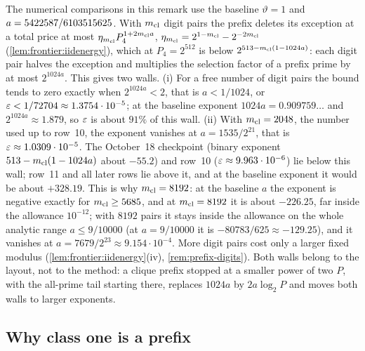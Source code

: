 \begin{remark}\label{rem:record:prefix-walls}
The numerical comparisons in this remark use the baseline $\vartheta=1$ and $a=5422587/6103515625$. With $m_{\mathrm{cl}}$ digit pairs the prefix deletes its exception at a total price at most
$\eta_{m_{\mathrm{cl}}}P_4^{1+2m_{\mathrm{cl}} a}$, $\eta_{m_{\mathrm{cl}}}=2^{1-m_{\mathrm{cl}}}-2^{-2m_{\mathrm{cl}}}$
(\cref{lem:frontier:iidenergy}),
which at $P_4=2^{512}$ is below $2^{513-m_{\mathrm{cl}}(1-1024a)}$: each digit pair halves the
exception and multiplies the selection factor of a prefix prime by at most
$2^{1024a}$. This gives two walls. (i) For a free number of digit pairs the
bound tends to zero exactly when $2^{1024a}<2$, that is $a<1/1024$, or
$\varepsilon<1/72704\approx1.3754\cdot10^{-5}$; at the baseline exponent
$1024a=0.909759\ldots$ and $2^{1024a}\approx1.879$, so $\varepsilon$ is about $91\%$ of
this wall. (ii) With $m_{\mathrm{cl}}=2048$, the number used up to row~10, the exponent
vanishes at $a=1535/2^{21}$, that is $\varepsilon\approx1.0309\cdot10^{-5}$. The October~18 checkpoint (binary exponent $513-m_{\mathrm{cl}}(1-1024a)$ about $-55.2$) and row~10
($\varepsilon\approx9.963\cdot10^{-6}$) lie below this wall; row~11 and all later rows
lie above it, and at the baseline exponent it would be about $+328.19$. This is why
$m_{\mathrm{cl}}=8192$: at the baseline $a$ the exponent is negative exactly for $m_{\mathrm{cl}}\ge5685$,
and at $m_{\mathrm{cl}}=8192$ it is about $-226.25$, far inside the allowance $10^{-12}$;
with $8192$ pairs it stays inside the allowance on the whole analytic range
$a\le9/10000$ (at $a=9/10000$ it is $-80783/625\approx-129.25$), and it vanishes
at $a=7679/2^{23}\approx9.154\cdot10^{-4}$. More digit pairs cost only a larger
fixed modulus (\cref{lem:frontier:iidenergy}(iv), \cref{rem:prefix-digits}).
Both walls belong to the layout, not to the method:
a clique prefix stopped at a smaller power of two $P$, with the all-prime tail
starting there, replaces $1024a$ by $2a\log_2P$ and moves both walls to larger
exponents.
\end{remark}

\subsection{Why class one is a prefix}\label{subsec:obs:class-one}

